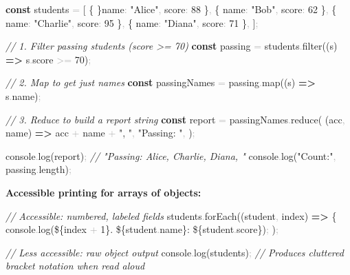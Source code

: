 \documentclass[
  justified,
  openright,
]{tufte-book}
\newcommand{\KeywordTok}[1]{\textcolor{CodeKeyword}{\textbf{#1}}}  %
\newcommand{\StringTok}[1]{\textcolor{CodeString}{#1}}              %
\newcommand{\CommentTok}[1]{\textcolor{CodeComment}{\textit{#1}}}  %
\newcommand{\CodeNumTok}[1]{\textcolor{CodeNumber}{#1}}             %
\newcommand{\CodeFuncTok}[1]{\textcolor{CodeKeyword}{#1}}           %
\newcommand{\CodeTypeTok}[1]{\textcolor{CodeType}{#1}}              %
\newcommand{\OperatorTok}[1]{\textcolor{DarkGray}{#1}}              %
\newenvironment{Shaded}{%
  \begin{mdframed}[style=TufteCode]%
}{%
  \end{mdframed}%
}
\begin{document}
\begin{Shaded}
\begin{Highlighting}[]
\KeywordTok{const} students \OperatorTok{=} [
  \{ \}\CodeTypeTok{name}\OperatorTok{:} \StringTok{"Alice"}\OperatorTok{,} \CodeTypeTok{score}\OperatorTok{:} \CodeNumTok{88} \}\OperatorTok{,}
  \{ \CodeTypeTok{name}\OperatorTok{:} \StringTok{"Bob"}\OperatorTok{,} \CodeTypeTok{score}\OperatorTok{:} \CodeNumTok{62} \}\OperatorTok{,}
  \{ \CodeTypeTok{name}\OperatorTok{:} \StringTok{"Charlie"}\OperatorTok{,} \CodeTypeTok{score}\OperatorTok{:} \CodeNumTok{95} \}\OperatorTok{,}
  \{ \CodeTypeTok{name}\OperatorTok{:} \StringTok{"Diana"}\OperatorTok{,} \CodeTypeTok{score}\OperatorTok{:} \CodeNumTok{71} \}\OperatorTok{,}
]\OperatorTok{;}
 
\CommentTok{// 1. Filter passing students (score \textgreater{}= 70)}
\KeywordTok{const} passing \OperatorTok{=} students\OperatorTok{.}\CodeFuncTok{filter}((s) \KeywordTok{=\textgreater{}} s\OperatorTok{.}\CodeTypeTok{score} \OperatorTok{\textgreater{}=} \CodeNumTok{70})\OperatorTok{;}
 
\CommentTok{// 2. Map to get just names}
\KeywordTok{const} passingNames \OperatorTok{=} passing\OperatorTok{.}\CodeFuncTok{map}((s) \KeywordTok{=\textgreater{}} s\OperatorTok{.}\CodeTypeTok{name})\OperatorTok{;}
 
\CommentTok{// 3. Reduce to build a report string}
\KeywordTok{const} report \OperatorTok{=} passingNames\OperatorTok{.}\CodeFuncTok{reduce}(
  (acc\OperatorTok{,} name) \KeywordTok{=\textgreater{}} acc \OperatorTok{+} name \OperatorTok{+} \StringTok{", "}\OperatorTok{,}
  \StringTok{"Passing: "}\OperatorTok{,}
)\OperatorTok{;}
 
console\OperatorTok{.}\CodeFuncTok{log}(report)\OperatorTok{;} \CommentTok{// "Passing: Alice, Charlie, Diana, "}
console\OperatorTok{.}\CodeFuncTok{log}(\StringTok{"Count:"}\OperatorTok{,} passing\OperatorTok{.}\CodeTypeTok{length})\OperatorTok{;}
\end{Highlighting}
\end{Shaded}

\textbf{Accessible printing for arrays of objects:}

\begin{Shaded}
\begin{Highlighting}[]
\CommentTok{// Accessible: numbered, labeled fields}
students\OperatorTok{.}\CodeFuncTok{forEach}((student\OperatorTok{,} index) \KeywordTok{=\textgreater{}} \{
  console\OperatorTok{.}\CodeFuncTok{log}(\StringTok{\textasciigrave{}}\StringTok{\$\{}index \OperatorTok{+} \CodeNumTok{1}\StringTok{\}}\StringTok{. }\StringTok{\$\{}student\OperatorTok{.}\CodeTypeTok{name}\StringTok{\}}\StringTok{: }\StringTok{\$\{}student\OperatorTok{.}\CodeTypeTok{score}\StringTok{\}}\StringTok{\textasciigrave{}})\OperatorTok{;}
)\OperatorTok{;}
 
\CommentTok{// Less accessible: raw object output}
console\OperatorTok{.}\CodeFuncTok{log}(students)\OperatorTok{;} \CommentTok{// Produces cluttered bracket notation when read aloud}
\end{Highlighting}
\end{Shaded}
\end{document}
